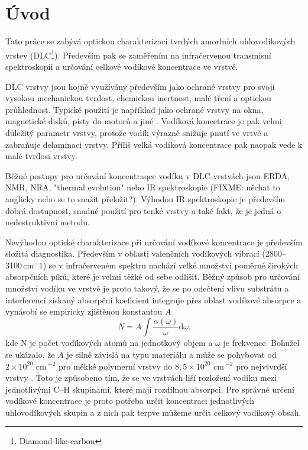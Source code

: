 \chapter{Úvod}
\setcounter{page}{1}

Tato práce se zabývá optickou charakterizací tvrdých amorfních uhlovodíkových vrstev (DLC\footnote{Diamond-like-carbon}). Především pak se zaměřením na infračervenou transmisní spektroskopii a určování celkové vodíkové koncentrace ve vrstvě.

DLC vrstvy jsou hojně využívány především jako ochrané vrstvy pro svoji vysokou mechanickou tvrdost, chemickou inertnost, malé tření a optickou průhlednost. Typické použití je například jako ochrané vrstvy na okna, magnetické disků, písty do motorů a jiné \cite{Robertson2002}.  Vodíková koncetrace je pak velmi důležitý parametr vrstvy, protože vodík výrazně snižuje pnutí ve vrtvě a zabraňuje delaminaci vrstvy. Příliš velká vodíková koncentrace pak naopak vede k malé tvrdosi vrstvy. 

Běžné postupy pro určování koncentraqce vodíku v DLC vrstvách jsou ERDA, NMR, NRA, "thermal evolution" nebo IR spektroskopie \cite{Robertson2002} (FIXME: něchat to anglicky nebo se to snažit přeložit?). Výhodou IR spektroskopie je především dobrá dostupnost, snadné použití pro tenké vrstvy a také fakt, že je jedná o nedestruktivní metodu. 

Nevýhodou optické charakterizace při určování vodíkové koncentrace je především složitá diagnostika. Především v oblasti valenčních vodíkových vibrací (2800--3100\,cm$^-1$) se v infračerveném spektru nachází velké množství poměrně širokých absorpčních píků, které je velmi těžké od sebe odlišit. Běžný způsob pro určování množství vodíku ve vrstvě je proto takový, že se po odečtení vlivu substrátu a interferencí získaný absorpční koeficient integruje přes oblast vodíkové absorpce a vynásobí se empiricky zjištěnou konstantou $A$
\begin{equation}
N = A \int \frac{\alpha(\omega)}{\omega} \mathrm{d}\omega \text{,}
\end{equation}
kde N je počet vodíkových atomů na jednotkový objem a $\omega$ je frekvence. Bohužel se ukázalo, že $A$ je silně závislá na typu materíálu a může se pohybovat od $2 \times 10^{20}$ cm\,$^{-2}$ pro měkké polymerní vrstvy do $8,5 \times 10^{20}$ cm\,$^{-2}$ pro nejvtvrdší vrstvy \cite{jacob1996}. Toto je způsobeno tím, že se ve vrstvách liší rozložení vodíku mezi jednotlivými C--H skupinami, které mají rozdílnou absorpci. Pro správné určení vodíkové koncentrace je proto potřeba určit koncentraci jednotlivých uhlovodíkových skupin a z nich pak terpve můžeme určit celkový vodíkový obsah. 


